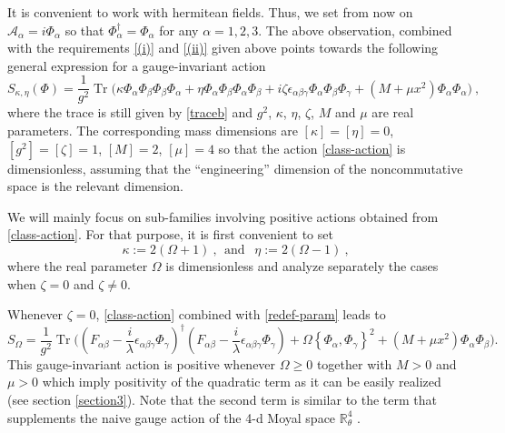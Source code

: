 \documentclass[a4paper,11pt,twoside]{article}
\numberwithin{equation}{section}
\DeclareMathOperator{\tr}{Tr}
\theoremstyle{nonumberplain}
\newcounter{and}
\begin{document}
%
It is convenient to work with hermitean fields. Thus, we set from now on $\mathcal{A}_\alpha = i \Phi_\alpha$ so that $\Phi^\dag_\alpha = \Phi_\alpha$ for any $\alpha=1,2,3$. The above observation, combined with the requirements \ref{(i)} and \ref{(ii)} given above points towards the following general expression for a gauge-invariant action%
%
\begin{equation}
S_{\kappa,\eta}(\Phi) = \frac{1}{g^2} \tr\bigg( \kappa \Phi_\alpha \Phi_\beta \Phi_\beta \Phi_\alpha + \eta \Phi_\alpha \Phi_\beta \Phi_\alpha \Phi_\beta + i \zeta \epsilon_{\alpha\beta\gamma} \Phi_\alpha \Phi_\beta \Phi_\gamma + \left(M+\mu x^2\right) \Phi_\alpha \Phi_\alpha \bigg) \ , \label{class-action}
\end{equation}
%
where the trace is still given by \eqref{traceb} and $g^2$, $\kappa$, $\eta$, $\zeta$, $M$ and $\mu$ are real parameters. The corresponding mass dimensions are $[\kappa]=[\eta]=0$, $[g^2]=[\zeta]=1$, $[M]=2$, $[\mu]=4$ so that the action \eqref{class-action} is dimensionless, assuming that the ``engineering'' dimension of the noncommutative space is the relevant dimension.\par%
%
We will mainly focus on sub-families involving positive actions obtained from \eqref{class-action}. For that purpose, it is first convenient to set%
%
\begin{equation}
\kappa := 2(\Omega+1) \ , \ \ \mbox{and } \ \ \eta := 2(\Omega-1) \ , \label{redef-param}
\end{equation}
%
where the real parameter $\Omega$ is dimensionless and analyze separately the cases when $\zeta=0$ and $\zeta\ne0$.\par%
%
Whenever $\zeta=0$, \eqref{class-action} combined with \eqref{redef-param} leads to%
%
\begin{equation}
S_\Omega = \frac{1}{g^2} \tr\bigg(\left(F_{\alpha\beta} - \frac{i}{\lambda} \epsilon_{\alpha\beta\gamma} \Phi_\gamma\right)^\dag \left(F_{\alpha\beta} - \frac{i}{\lambda} \epsilon_{\alpha\beta\gamma} \Phi_\gamma\right) + \Omega\left\{\Phi_\alpha,\Phi_\gamma\right\}^2 + \left(M+\mu x^2\right) \Phi_\alpha \Phi_\beta \bigg) \label{zeta=0}.
\end{equation}
%
This gauge-invariant action is positive whenever $\Omega\ge0$ together with $M>0$ and $\mu>0$ which imply positivity of the quadratic term as it can be easily realized (see section \ref{section3}). Note that the second term is similar to the term that supplements the naive gauge action of the 4-d Moyal space $\mathbb{R}^4_\theta$ \cite{GWW, GW07}.\par%
\end{document}
